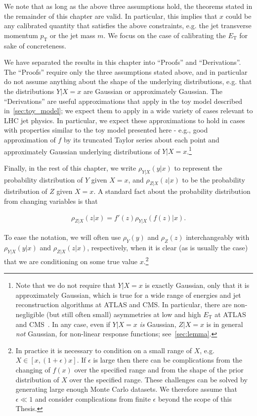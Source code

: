 We note that as long as the above three assumptions hold, the theorems stated in the remainder of this chapter are valid. In particular, this implies that $x$ could be any calibrated quantity that satisfies the above constraints, e.g. the jet transverse momentum $p_\text{T}$ or the jet mass $m$. We focus on the case of calibrating the $E_\text{T}$ for sake of concreteness.

We have separated the results in this chapter into ``Proofs'' and ``Derivations''. The ``Proofs'' require only the three assumptions stated above, and in particular do not assume anything about the shape of the underlying distributions, e.g. that the distributions $Y|X=x$ are Gaussian or approximately Gaussian. The ``Derivations'' are useful approximations that apply in the toy model described in~\ref{sec:toy_model}; we expect them to apply in a wide variety of cases relevant to LHC jet physics. In particular, we expect these approximations to hold in cases with properties similar to the toy model presented here - e.g., good approximation of $f$ by its truncated Taylor series about each point and approximately Gaussian underlying distributions of $Y|X=x$.\footnote{Note that we do not require that $Y|X=x$ is exactly Gaussian, only that it is approximately Gaussian, which is true for a wide range of energies and jet reconstruction algorithms at ATLAS and CMS. In particular, there are non-negligible (but still often small) asymmetries at low and high $E_\text{T}$ at ATLAS and CMS~\cite{Aad:2011he,Chatrchyan:2011ds,Khachatryan:2016kdb}. In any case, even if $Y|X=x$ {\it is} Gaussian, $Z|X=x$ is in general {\it not} Gaussian, for non-linear response functions; see~\ref{sec:lemma}.}

Finally, in the rest of this chapter, we write $\rho_{Y|X}(y|x)$ to represent the probability distribution of $Y$ given $X=x$, and $\rho_{Z|X}(z|x)$ to be the probability distribution of $Z$ given $X=x$. A standard fact about the probability distribution from changing variables is that

\begin{align}
\rho_{Z|X}(z|x) = f'(z)\rho_{Y|X}(f(z)|x).
\label{eqn:newdist}
\end{align}

To ease the notation, we will often use $\rho_Y(y)$ and $\rho_Z(z)$ interchangeably with $\rho_{Y|X}(y|x)$ and $\rho_{Z|X}(z|x)$, respectively, when it is clear (as is usually the case) that we are conditioning on some true value $x$.\footnote{In practice it is necessary to condition on a small range of $X$, e.g. $X\in[x,(1+\epsilon)x]$. If $\epsilon$ is large then there can be complications from the changing of $f(x)$ over the specified range and from the shape of the prior distribution of $X$ over the specified range.  These challenges can be solved by generating large enough Monte Carlo datasets.  We therefore assume that $\epsilon \ll 1$ and consider complications from finite $\epsilon$ beyond the scope of this Thesis.}

